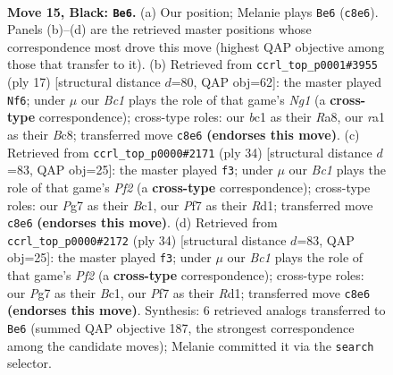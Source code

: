\documentclass[11pt]{article}
\begin{document}
\clearpage

\begin{figure}[p]\centering
\begin{subfigure}{0.46\textwidth}\centering
\resizebox{\linewidth}{!}{%
\newchessgame
\chessboard[
  setfen={rnb1r1k1/ppq2ppp/8/2bn2N1/P6P/6P1/1P1N1PB1/R1BQ1RK1 b - - 1 15},
  showmover=false,
  pgfstyle=straightmove, color=movearrow, markmove={c8-e6}
]}
\caption{}
\end{subfigure}\hfill
\begin{subfigure}{0.46\textwidth}\centering
\resizebox{\linewidth}{!}{%
\newchessgame
\chessboard[
  setfen={r1bqk1nr/pp3ppp/1bn5/3p4/8/1N4P1/PP2PPBP/RNBQ1RK1 b kq - 1 9},
  showmover=false,
  pgfstyle=straightmove, color=movearrow, markmove={g8-f6}
]}
\caption{}
\end{subfigure}
\\[4pt]
\begin{subfigure}{0.46\textwidth}\centering
\resizebox{\linewidth}{!}{%
\newchessgame
\chessboard[
  setfen={r2q1rk1/ppp3bp/5pp1/4n3/3N2b1/2Q3P1/PP3PBP/R1BR2K1 w - - 3 18},
  showmover=false,
  pgfstyle=straightmove, color=movearrow, markmove={f2-f3}
]}
\caption{}
\end{subfigure}\hfill
\begin{subfigure}{0.46\textwidth}\centering
\resizebox{\linewidth}{!}{%
\newchessgame
\chessboard[
  setfen={r2q1rk1/ppp3bp/5pp1/4n3/3N2b1/2Q3P1/PP3PBP/R1BR2K1 w - - 3 18},
  showmover=false,
  pgfstyle=straightmove, color=movearrow, markmove={f2-f3}
]}
\caption{}
\end{subfigure}
\caption{\textbf{Move 15, Black: \texttt{Be6}.} (a) Our position; Melanie plays \texttt{Be6} (\texttt{c8e6}). Panels (b)--(d) are the retrieved master positions whose correspondence most drove this move (highest QAP objective among those that transfer to it). (b) Retrieved from \texttt{ccrl\_top\_p0001\#3955} (ply 17) [structural distance $d$=80, QAP obj=62]: the master played \texttt{Nf6}; under $\mu$ our \emph{Bc1} plays the role of that game's \emph{Ng1} (a \textbf{cross-type} correspondence); cross-type roles: our \emph{b}c1 as their \emph{R}a8, our \emph{r}a1 as their \emph{B}c8; transferred move \texttt{c8e6} \textbf{(endorses this move)}. (c) Retrieved from \texttt{ccrl\_top\_p0000\#2171} (ply 34) [structural distance $d$=83, QAP obj=25]: the master played \texttt{f3}; under $\mu$ our \emph{Bc1} plays the role of that game's \emph{Pf2} (a \textbf{cross-type} correspondence); cross-type roles: our \emph{P}g7 as their \emph{B}c1, our \emph{P}f7 as their \emph{R}d1; transferred move \texttt{c8e6} \textbf{(endorses this move)}. (d) Retrieved from \texttt{ccrl\_top\_p0000\#2172} (ply 34) [structural distance $d$=83, QAP obj=25]: the master played \texttt{f3}; under $\mu$ our \emph{Bc1} plays the role of that game's \emph{Pf2} (a \textbf{cross-type} correspondence); cross-type roles: our \emph{P}g7 as their \emph{B}c1, our \emph{P}f7 as their \emph{R}d1; transferred move \texttt{c8e6} \textbf{(endorses this move)}. Synthesis: 6 retrieved analogs transferred to \texttt{Be6} (summed QAP objective 187, the strongest correspondence among the candidate moves); Melanie committed it via the \texttt{search} selector.}
\label{fig:thought-m29}
\end{figure}
\end{document}
